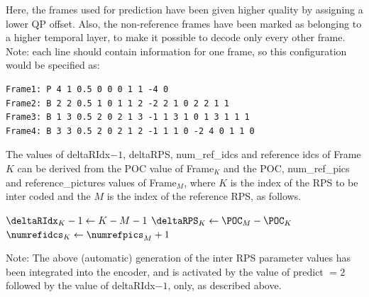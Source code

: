 \documentclass[a3paper,11pt]{jctvcdoc}
\begin{document}
Here, the frames used for prediction have been given higher
quality by assigning a lower QP offset. Also, the non-reference
frames have been marked as belonging to a higher temporal layer,
to make it possible to decode only every other frame. Note: each
line should contain information for one frame, so this
configuration would be specified as:

\begin{verbatim}
Frame1: P 4 1 0.5 0 0 0 1 1 -4 0
Frame2: B 2 2 0.5 1 0 1 1 2 -2 2 1 0 2 2 1 1
Frame3: B 1 3 0.5 2 0 2 1 3 -1 1 3 1 0 1 3 1 1 1
Frame4: B 3 3 0.5 2 0 2 1 2 -1 1 1 0 -2 4 0 1 1 0
\end{verbatim}

The values of deltaRIdx$-1$, deltaRPS, num_ref_idcs and reference
idcs of Frame$K$ can be derived from the POC value of Frame$_K$ and
the POC, num_ref_pics and reference_pictures values of Frame$_M$, where
$K$ is the index of the RPS to be inter coded and the $M$ is the
index of the reference RPS, as follows.

\setlength{\algomargin}{2em}
\begin{algorithm}[h]

    $\deltaRIdx_K - 1  \leftarrow  K - M - 1$ \;
    $\deltaRPS_K       \leftarrow  \POC_M - \POC_K$ \;
    $\numrefidcs_K     \leftarrow  \numrefpics_M + 1$ \;


\end{algorithm}

Note: The above (automatic) generation of the inter RPS parameter
values has been integrated into the encoder, and is activated by
the value of predict $= 2$ followed by the value of deltaRIdx$-1$,
only, as described above.
\end{document}
